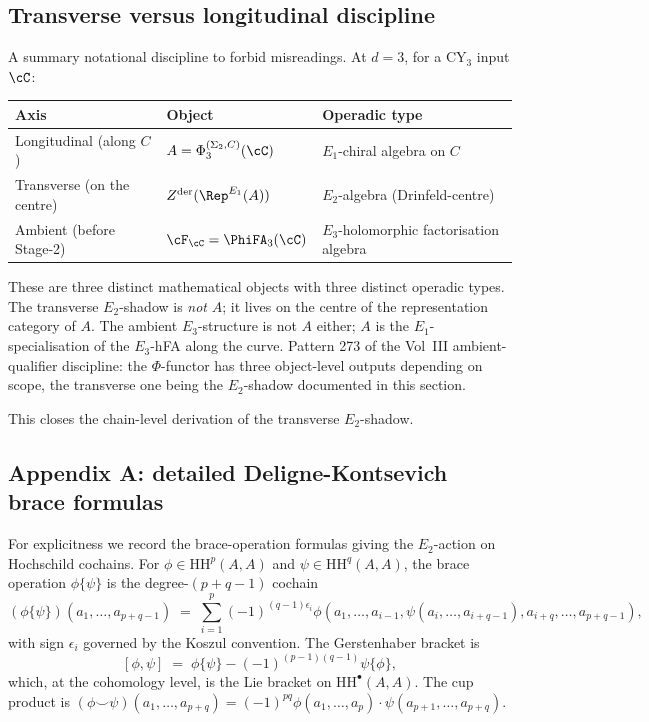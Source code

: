 \subsection*{Transverse versus longitudinal discipline}

A summary notational discipline to forbid misreadings.  At $d = 3$,
for a CY$_3$ input $\cC$:

\begin{center}
\renewcommand{\arraystretch}{1.3}
\small
\begin{tabular}{lll}
 \toprule
 \textbf{Axis} & \textbf{Object} & \textbf{Operadic type} \\
 \midrule
 Longitudinal (along $C$) & $A = \Phi_3^{(\Sigma_2, C)}(\cC)$ &
 $E_1$-chiral algebra on $C$ \\
 Transverse (on the centre) &
 $Z^{\mathrm{der}}(\Rep^{E_1}(A))$ &
 $E_2$-algebra (Drinfeld-centre) \\
 Ambient (before Stage-2) & $\cF_\cC = \PhiFA_3(\cC)$ &
 $E_3$-holomorphic factorisation algebra \\
 \bottomrule
\end{tabular}
\end{center}

These are three distinct mathematical objects with three distinct
operadic types.  The transverse $E_2$-shadow is \emph{not} $A$; it
lives on the centre of the representation category of $A$.  The
ambient $E_3$-structure is not $A$ either; $A$ is the
$E_1$-specialisation of the $E_3$-hFA along the curve.  Pattern 273
of the Vol~III ambient-qualifier discipline: the $\Phi$-functor has
three object-level outputs depending on scope, the transverse one
being the $E_2$-shadow documented in this section.

This closes the chain-level derivation of the transverse $E_2$-shadow.

\subsection*{Appendix A: detailed Deligne-Kontsevich brace formulas}

For explicitness we record the brace-operation formulas giving the
$E_2$-action on Hochschild cochains.  For $\phi \in \mathrm{HH}^p(A,
A)$ and $\psi \in \mathrm{HH}^q(A, A)$, the brace operation $\phi\{\psi\}$
is the degree-$(p+q-1)$ cochain
\[
 (\phi\{\psi\})(a_1, \ldots, a_{p+q-1}) \;=\;
 \sum_{i=1}^{p} (-1)^{(q-1)\epsilon_i}
 \phi(a_1, \ldots, a_{i-1}, \psi(a_i, \ldots, a_{i+q-1}),
 a_{i+q}, \ldots, a_{p+q-1}),
\]
with sign $\epsilon_i$ governed by the Koszul convention.  The
Gerstenhaber bracket is
\[
 [\phi, \psi] \;=\; \phi\{\psi\} - (-1)^{(p-1)(q-1)} \psi\{\phi\},
\]
which, at the cohomology level, is the Lie bracket on
$\mathrm{HH}^\bullet(A, A)$.  The cup product is
$(\phi \smile \psi)(a_1, \ldots, a_{p+q}) = (-1)^{pq} \phi(a_1, \ldots,
a_p) \cdot \psi(a_{p+1}, \ldots, a_{p+q})$.

